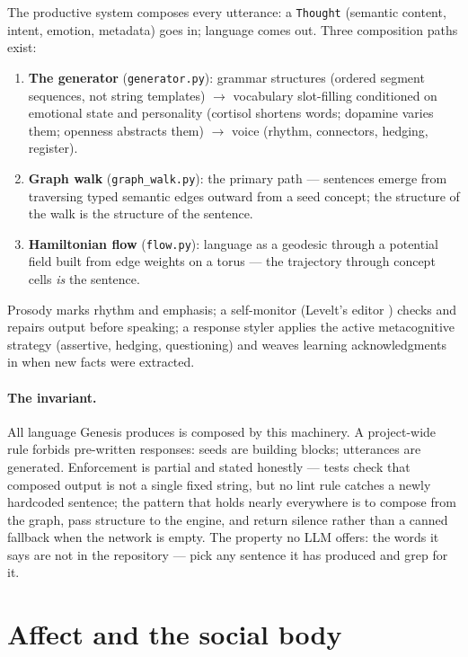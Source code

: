 \documentclass[11pt]{article}
\newcommand{\code}[1]{\texttt{\small #1}}
\begin{document}
The productive system composes every utterance: a \code{Thought}
(semantic content, intent, emotion, metadata) goes in; language comes
out. Three composition paths exist:

\begin{enumerate}
  \item \textbf{The generator} (\code{generator.py}): grammar
    structures (ordered segment sequences, not string templates)
    $\to$ vocabulary slot-filling conditioned on emotional state and
    personality (cortisol shortens words; dopamine varies them; openness
    abstracts them) $\to$ voice (rhythm, connectors, hedging, register).
  \item \textbf{Graph walk} (\code{graph\_walk.py}): the primary path ---
    sentences emerge from traversing typed semantic edges outward from
    a seed concept; the structure of the walk is the structure of the
    sentence.
  \item \textbf{Hamiltonian flow} (\code{flow.py}): language as a
    geodesic through a potential field built from edge weights on a
    torus --- the trajectory through concept cells \emph{is} the
    sentence.
\end{enumerate}

Prosody \cite{cutler} marks rhythm and emphasis; a self-monitor
(Levelt's editor \cite{levelt})
checks and repairs output before speaking; a response styler applies
the active metacognitive strategy (assertive, hedging, questioning) and
weaves learning acknowledgments in when new facts were extracted.

\paragraph{The invariant.} All language Genesis produces is composed by
this machinery. A project-wide rule forbids pre-written responses:
seeds are building blocks; utterances are generated. Enforcement is
partial and stated honestly --- tests check that composed output is
not a single fixed string, but no lint rule catches a newly hardcoded
sentence; the pattern that holds nearly everywhere is to compose from
the graph, pass structure to the engine, and return silence rather than
a canned fallback when the network is empty. The property no LLM
offers: the words it says are not in the repository --- pick any
sentence it has produced and grep for it.

\section{Affect and the social body}
\end{document}
